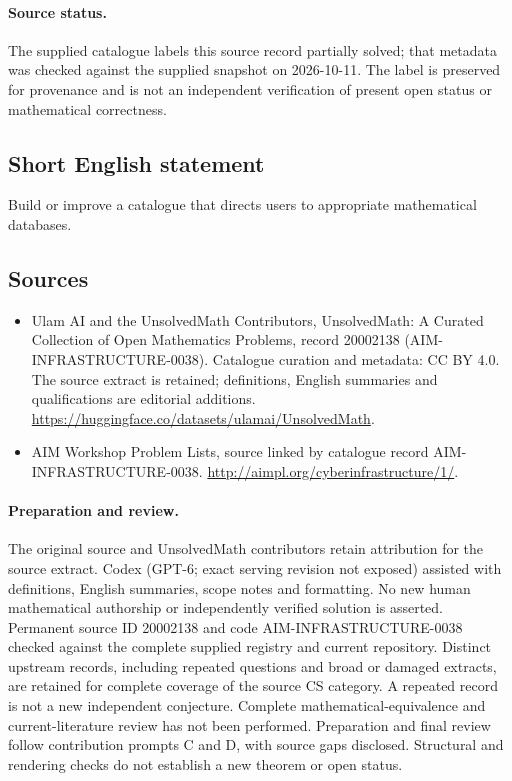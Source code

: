 \documentclass[11pt]{article}
\begin{document}
\paragraph{Source status.}
The supplied catalogue labels this source record partially solved; that metadata was checked against the supplied snapshot on 2026-10-11. The label is preserved for provenance and is not an independent verification of present open status or mathematical correctness.
\subsection{Short English statement}
Build or improve a catalogue that directs users to appropriate mathematical databases.
\subsection{Sources}
\begin{itemize}
\item[\hypertarget{source:20002138:1}{S1}] Ulam AI and the UnsolvedMath Contributors, UnsolvedMath: A Curated Collection of Open Mathematics Problems, record 20002138 (AIM-INFRASTRUCTURE-0038). Catalogue curation and metadata: CC BY 4.0. The source extract is retained; definitions, English summaries and qualifications are editorial additions.
\url{https://huggingface.co/datasets/ulamai/UnsolvedMath}.
\item[\hypertarget{source:20002138:2}{S2}] AIM Workshop Problem Lists, source linked by catalogue record AIM-INFRASTRUCTURE-0038.
\url{http://aimpl.org/cyberinfrastructure/1/}.
\end{itemize}
\paragraph{Preparation and review.}
The original source and UnsolvedMath contributors retain attribution for the source extract. Codex (GPT-6; exact serving revision not exposed) assisted with definitions, English summaries, scope notes and formatting. No new human mathematical authorship or independently verified solution is asserted. Permanent source ID 20002138 and code AIM-INFRASTRUCTURE-0038 checked against the complete supplied registry and current repository. Distinct upstream records, including repeated questions and broad or damaged extracts, are retained for complete coverage of the source CS category. A repeated record is not a new independent conjecture. Complete mathematical-equivalence and current-literature review has not been performed. Preparation and final review follow contribution prompts C and D, with source gaps disclosed. Structural and rendering checks do not establish a new theorem or open status.
\label{end:20002138}
\end{document}
